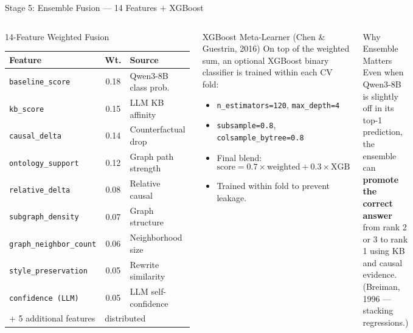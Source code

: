 \documentclass[aspectratio=169]{beamer}
\begin{document}
\begin{frame}{Stage 5: Ensemble Fusion --- 14 Features + XGBoost}
\begin{columns}[T]
\begin{block}{14-Feature Weighted Fusion}
\footnotesize
\setlength{\tabcolsep}{3pt}
\renewcommand{\arraystretch}{1.15}
\begin{tabular}{p{3.5cm}cl}
\toprule
\textbf{Feature} & \textbf{Wt.} & \textbf{Source}\\
\midrule
\texttt{baseline\_score} & 0.18 & Qwen3-8B class prob.\\
\texttt{kb\_score} & 0.15 & LLM KB affinity\\
\texttt{causal\_delta} & 0.14 & Counterfactual drop\\
\texttt{ontology\_support} & 0.12 & Graph path strength\\
\texttt{relative\_delta} & 0.08 & Relative causal\\
\texttt{subgraph\_density} & 0.07 & Graph structure\\
\texttt{graph\_neighbor\_count} & 0.06 & Neighborhood size\\
\texttt{style\_preservation} & 0.05 & Rewrite similarity\\
\texttt{confidence (LLM)} & 0.05 & LLM self-confidence\\
+ 5 additional features & \multicolumn{2}{l}{distributed}\\
\bottomrule
\end{tabular}
\end{block}
\begin{block}{XGBoost Meta-Learner (Chen \& Guestrin, 2016)}
On top of the weighted sum, an optional XGBoost binary classifier is trained within each CV fold:
\begin{itemize}
  \item \texttt{n\_estimators=120}, \texttt{max\_depth=4}
  \item \texttt{subsample=0.8}, \texttt{colsample\_bytree=0.8}
  \item Final blend:
  \[
    \text{score} = 0.7 \times \text{weighted} + 0.3 \times \text{XGB}
  \]
  \item Trained within fold to prevent leakage.
\end{itemize}
\end{block}
\vspace{6pt}
\begin{block}{Why Ensemble Matters}
Even when Qwen3-8B is slightly off in its top-1 prediction, the ensemble can \textbf{promote the correct answer} from rank 2 or 3 to rank 1 using KB and causal evidence. (Breiman, 1996 --- stacking regressions.)
\end{block}
\end{columns}
\end{frame}
\end{document}
